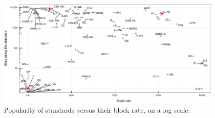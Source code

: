 \begin{figure}[ht]
  \centering
  \includegraphics[width=\textwidth]{figures/megagraph.pdf}
  \caption{Popularity of standards versus their block rate, on a log scale.}
  \label{fig:megagraph}
\end{figure}
